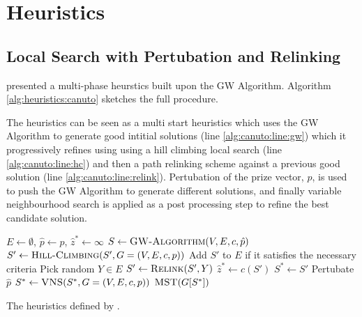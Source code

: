 \section{Heuristics}\label{sec:solving:heuristics}

\subsection{Local Search with Pertubation and Relinking}\label{sec:canuto-search}

\cite{canuto2001local} presented a multi-phase heurstics built upon the GW Algorithm.
 Algorithm \ref{alg:heuristics:canuto} sketches the full procedure. 

 The heuristics can be seen as a multi start heuristics which uses the GW Algorithm
 to generate good intitial
 solutions (line \ref{alg:canuto:line:gw})
 which it progressively refines using using a hill climbing local search
 (line \ref{alg:canuto:line:hc})
 and then a path relinking scheme against a previous good solution
 (line \ref{alg:canuto:line:relink}).
 Pertubation of the prize vector, $p$, is used to push the GW Algorithm to generate
 different solutions, and finally variable neighbourhood search is applied as a
 post processing step to refine the best candidate solution.

 \begin{algorithm}[h!]
   \begin{algorithmic}[1]
     \State $E \gets \emptyset$, $\hat{p} \gets p$, $\hat{z}^* \gets \infty$
     \State $S \gets \Call{GW-Algorithm}{V,E, c, \hat{p}}$ \label{alg:canuto:line:gw}
     \State $S' \gets \Call{Hill-Climbing}{S', G = (V, E, c, p)}$ \label{alg:canuto:line:hc}
     \State Add $S'$ to $E$ if it satisfies the necessary criteria \label{alg:canuto:line:elite}
     \State Pick random $Y \in E$
     \State $S' \gets \Call{Relink}{S', Y}$ \label{alg:canuto:line:relink}
     \State $\hat{z}^* \gets c(S')$
     \State $S^* \gets S'$
     \EndIf
     \EndIf
     \State Pertubate $\hat{p}$
     \EndFor
     \State $S^* \gets \Call{VNS}{S^*, G = (V, E, c, p)}$\label{alg:canuto:line:vns}
     \State \Return $\Call{MST}{G[S^*]}$
     \EndProcedure
 \end{algorithmic}
 \caption{The heuristics defined by \cite{canuto2001local}.}\label{alg:heuristics:canuto}
 \end{algorithm}

